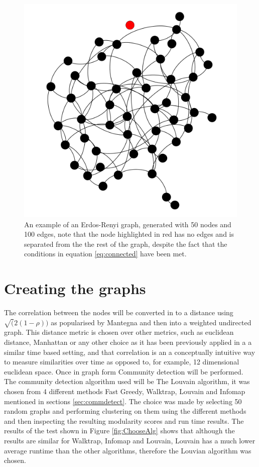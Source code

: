 \begin{figure}
    \centering
    \includegraphics{Figures/Method/RandomGraph}
    \caption[Example Erdos-Renyi Graph]{An example of an Erdos-Renyi graph, generated with 50 nodes and 100 edges, note that the node highlighted in red has no edges and is separated from the the rest of the graph, despite the fact that the conditions in equation \ref{eq:connected} have been met. }
    \label{fig:RandomGraph}
\end{figure}

\section{Creating the graphs}
\label{chap:creategraph}

The correlation between the nodes will be converted in to a distance using $\sqrt(2(1-\rho))$ as popularised by Mantegna \cite{mantegna1999} and then into a weighted undirected graph. This distance metric is chosen over other metrics, such as euclidean distance, Manhattan or any other choice as it has been previously applied in a a similar time based setting, and that correlation is an a conceptually intuitive way to measure similarities over time as opposed to, for example, 12 dimensional euclidean space.  Once in graph form Community detection will be performed. The community detection algorithm used will be The Louvain algorithm, it was chosen from 4 different methods Fast Greedy, Walktrap, Louvain and Infomap mentioned in sections \ref{sec:commdetect}. The choice was made by selecting 50 random graphs and performing clustering on them using the different methods and then inspecting the resulting modularity scores and run time results. The results of the test shown in Figure \ref{fig:ChooseAlg} shows that although the results are similar for Walktrap, Infomap and Louvain, Louvain has a much lower average runtime than the other algorithms, therefore the Louvian algorithm was chosen.

